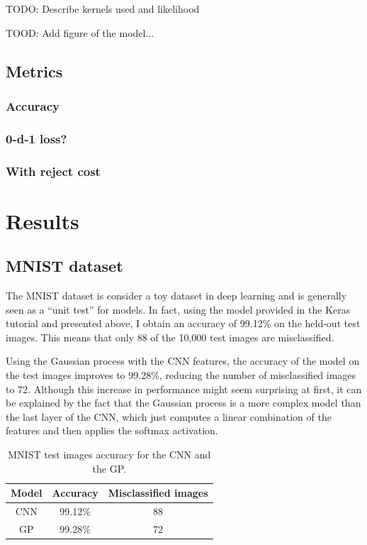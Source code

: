 \documentclass{article}
\begin{document}
TODO: Describe kernels used and likelihood

TOOD: Add figure of the model...

\subsection{Metrics}
\subsubsection{Accuracy}
\subsubsection{0-d-1 loss?}
\subsubsection{With reject cost}

\section{Results}
\subsection{MNIST dataset}
The MNIST dataset is consider a toy dataset in deep learning and is generally seen as a ``unit test'' for models. In fact, using the model provided in the Keras tutorial and presented above, I obtain an accuracy of 99.12\% on the held-out test images. This means that only 88 of the 10,000 test images are misclassified.

Using the Gaussian process with the CNN features, the accuracy of the model on the test images improves to 99.28\%, reducing the number of misclassified images to 72. Although this increase in performance might seem surprising at first, it can be explained by the fact that the Gaussian process is a more complex model than the last layer of the CNN, which just computes a linear combination of the features and then applies the softmax activation.

\begin{table}[h]
\centering	
\begin{tabular}{ c | c c}
\textbf{Model} & \textbf{Accuracy} & \textbf{Misclassified images}\\
\hline
CNN & 99.12\% & 88 \\
GP & 99.28\%  & 72\\
\end{tabular}
\caption{MNIST test images accuracy for the CNN and the GP.}
\label{table/mnist_acc}
\end{table}
\end{document}
